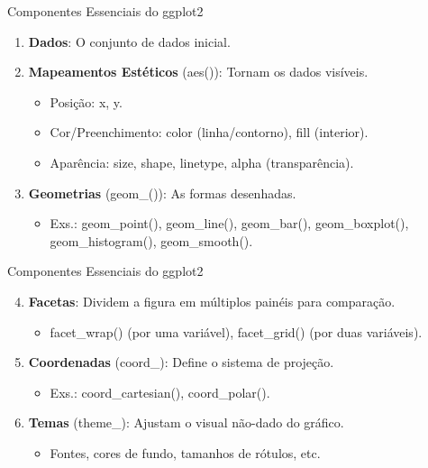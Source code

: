\documentclass[
  ignorenonframetext,
  serif,
  professionalfont,
  usenames,
  dvipsnames,
  aspectratio = 169]{beamer}
\providecommand{\tightlist}{%
  \setlength{\itemsep}{0pt}\setlength{\parskip}{0pt}}
\renewcommand{\tightlist}{%
  \setlength{\itemsep}{0\baselineskip}
  \setlength{\parskip}{0.25\baselineskip}
}
\begin{document}
\begin{frame}{Componentes Essenciais do ggplot2}
\label{componentes-essenciais-do-ggplot2}
\begin{enumerate}
\item
  \textbf{Dados}: O conjunto de dados inicial.
\item
  \textbf{Mapeamentos Estéticos} (aes()): Tornam os dados visíveis.

  \begin{itemize}
  \item
    Posição: x, y.
  \item
    Cor/Preenchimento: color (linha/contorno), fill (interior).
  \item
    Aparência: size, shape, linetype, alpha (transparência).
  \end{itemize}
\item
  \textbf{Geometrias} (geom\_()): As formas desenhadas.

  \begin{itemize}
  \tightlist
  \item
    Exs.: geom\_point(), geom\_line(), geom\_bar(), geom\_boxplot(),
    geom\_histogram(), geom\_smooth().
  \end{itemize}
\end{enumerate}
\end{frame}

\begin{frame}{Componentes Essenciais do ggplot2}
\label{componentes-essenciais-do-ggplot2-1}
\begin{enumerate}
\setcounter{enumi}{3}
\item
  \textbf{Facetas}: Dividem a figura em múltiplos painéis para
  comparação.

  \begin{itemize}
  \tightlist
  \item
    facet\_wrap() (por uma variável), facet\_grid() (por duas
    variáveis).
  \end{itemize}
\item
  \textbf{Coordenadas} (coord\_): Define o sistema de projeção.

  \begin{itemize}
  \tightlist
  \item
    Exs.: coord\_cartesian(), coord\_polar().
  \end{itemize}
\item
  \textbf{Temas} (theme\_): Ajustam o visual não-dado do gráfico.

  \begin{itemize}
  \tightlist
  \item
    Fontes, cores de fundo, tamanhos de rótulos, etc.
  \end{itemize}
\end{enumerate}
\end{frame}
\end{document}
